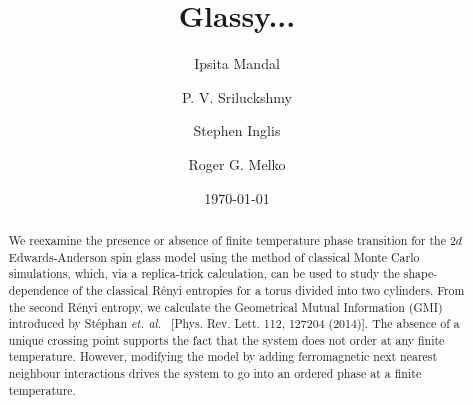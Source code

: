\documentclass[a4paper,aps,prl,reprint,superscriptaddress,twocolumn,floatfix]{revtex4-1}
\begin{document}
\newcommand{\beq}{\begin{equation}}
\newcommand{\eeq}{\end{equation}}
\newcommand{\beqa}{\begin{eqnarray}}
\newcommand{\eeqa}{\end{eqnarray}}
\newcommand{\ben}{\begin{enumerate}}
\newcommand{\een}{\end{enumerate}}
\newcommand{\hs}{\hspace{0.5cm}}
\newcommand{\vs}{\vspace{0.5cm}}

\title{Glassy...}

\author{Ipsita Mandal}

\author{ P. V. Sriluckshmy}

\author{Stephen Inglis}


\author{Roger G. Melko}

\date{\today}

\begin{abstract}
We reexamine the presence or absence of finite temperature phase transition for the $2d$ Edwards-Anderson spin glass model using the method of classical Monte Carlo simulations, which, via a replica-trick calculation, can be used to study the shape-dependence of the classical R\'enyi entropies for a torus divided into two cylinders.
From the second R\'enyi entropy, we calculate the Geometrical Mutual Information (GMI) introduced by St\'ephan {\it et. al.}~
[Phys. Rev. Lett. 112, 127204 (2014)]. The absence of a unique crossing point supports the fact that the system does not order at any finite temperature. However, modifying the model by adding  ferromagnetic next nearest neighbour interactions drives the system to go into an ordered phase at a finite temperature.
\end{abstract}

\maketitle
\end{document}
